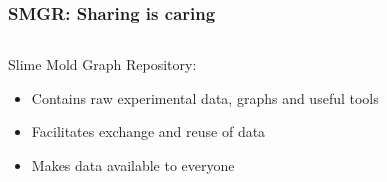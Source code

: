 \documentclass[	hyperref={pdfpagelabels=false}, xcolor=dvipsnames,
		11pt]{beamer}
\begin{document}
\begin{frame}
    \frametitle{SMGR: Sharing is caring} 


	\begin{columns}
	\begin{column}{4cm}

	\begin{overprint}

	  
		\begin{block}{Slime Mold Graph Repository:}
		  \begin{itemize}
		   \item Contains raw experimental data, graphs and useful tools
		   \item Facilitates exchange and reuse of data
		   \item Makes data available to everyone
		  \end{itemize}
		\end{block}


	\end{overprint}

	\end{column}

	\begin{column}{3cm}
	\begin{overprint}


\end{overprint}
\end{column}
\end{columns}
\end{frame}
\end{document}
